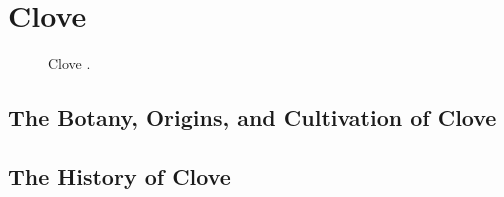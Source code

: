 \section{Clove}
\label{sec:clove}



\begin{figure}[!ht]
	\vspace{-4ex}
	\centering
	\hfill
	\hfill
	\caption{Clove \taxon{}.}
	\label{fig:clove_imgs}
\end{figure}

\subsection{The Botany, Origins, and Cultivation of Clove}

\subsection{The History of Clove}


